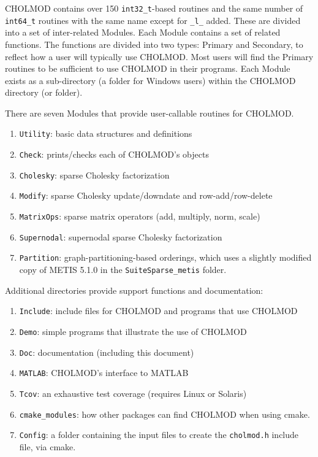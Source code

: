 \documentclass[11pt]{article}
\begin{document}
CHOLMOD contains over 150 {\tt int32\_t}-based routines and the same number of
{\tt int64\_t} routines with the same name except for {\tt \_l\_} added.  These
are divided into a set of inter-related Modules.  Each Module contains a set of
related functions.  The functions are divided into two types: Primary and
Secondary, to reflect how a user will typically use CHOLMOD.  Most users will
find the Primary routines to be sufficient to use CHOLMOD in their programs.
Each Module exists as a sub-directory (a folder for Windows users) within the
CHOLMOD directory (or folder).

\vspace{0.1in}
\noindent There are seven Modules that provide user-callable routines for
CHOLMOD.

    \begin{enumerate}
    \item {\tt Utility}: basic data structures and definitions
    \item {\tt Check}: prints/checks each of CHOLMOD's objects
    \item {\tt Cholesky}: sparse Cholesky factorization
    \item {\tt Modify}: sparse Cholesky update/downdate and row-add/row-delete
    \item {\tt MatrixOps}: sparse matrix operators (add, multiply, norm, scale)
    \item {\tt Supernodal}: supernodal sparse Cholesky factorization
    \item {\tt Partition}: graph-partitioning-based orderings,
        which uses a slightly modified copy of METIS 5.1.0 in the
        \verb'SuiteSparse_metis' folder.
    \end{enumerate}

\noindent Additional directories provide
    support functions and documentation:
    \begin{enumerate}
    \item {\tt Include}: include files for CHOLMOD and programs that use CHOLMOD
    \item {\tt Demo}: simple programs that illustrate the use of CHOLMOD
    \item {\tt Doc}: documentation (including this document)
    \item {\tt MATLAB}: CHOLMOD's interface to MATLAB
    \item {\tt Tcov}: an exhaustive test coverage (requires Linux or Solaris)
    \item \verb'cmake_modules':  how other packages can find CHOLMOD when
        using cmake.
    \item \verb'Config':  a folder containing the input files to create the
        \verb'cholmod.h' include file, via cmake.
    \end{enumerate}
\end{document}
